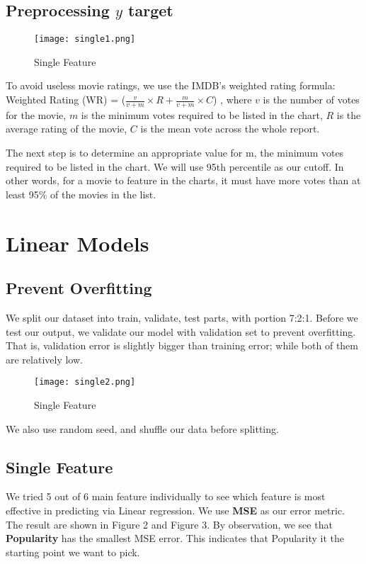 \documentclass[12pt]{article}
\begin{document}
\subsection{Preprocessing $y$ target}
\begin{wrapfigure}{R}{0.25\textwidth}
\centering
\texttt{[image: single1.png]}
\caption{Single Feature}
\end{wrapfigure}\par
To avoid useless movie ratings, we use the IMDB's weighted rating formula:
Weighted Rating (WR) = ($\frac{v}{v+m}\times R + \frac{m}{v+m}\times C$)
, where $v$ is the number of votes for the movie, $m$ is the minimum votes required to be listed in the chart, $R$ is the average rating of the movie, $C$ is the mean vote across the whole report.

The next step is to determine an appropriate value for m, the minimum votes required to be listed in the chart. We will use 95th percentile as our cutoff. In other words, for a movie to feature in the charts, it must have more votes than at least 95\% of the movies in the list.
\section{Linear Models}
\subsection{Prevent Overfitting}
We split our dataset into train, validate, test parts, with portion 7:2:1. Before we test our output, we validate our model with validation set to prevent overfitting. That is, validation error is slightly bigger than training error; while both of them are relatively low. \begin{wrapfigure}{L}{0.25\textwidth}
\centering
\texttt{[image: single2.png]}
\caption{Single Feature}
\end{wrapfigure}\par We also use random seed, and shuffle our data before splitting.
\subsection{Single Feature} We tried 5 out of 6 main feature individually to see which feature is most effective in predicting via Linear regression. We use \textbf{MSE} as our error metric. The result are shown in Figure 2 and Figure 3.
By observation, we see that \textbf{Popularity} has the smallest MSE error. This indicates that Popularity it the starting point we want to pick. 
\end{document}
